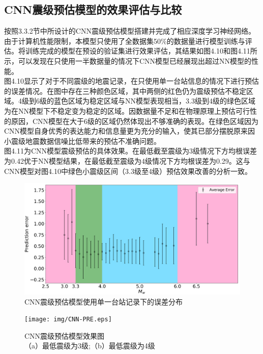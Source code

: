 \subsection{CNN震级预估模型的效果评估与比较}
\indent 按照3.3.2节中所设计的CNN震级预估模型搭建并完成了相应深度学习神经网络。由于计算机性能限制，本模型只使用了全数据集50\%的数据量进行模型训练与评估。将训练完成的模型在预设的验证集进行效果评估，其结果如图4.10和图4.11所示，可以发现在只使用一半数据量的情况下CNN模型已经展现出超过NN模型的性能。\\
\indent 图4.10显示了对于不同震级的地震记录，在只使用单一台站信息的情况下进行预估的误差情况。在图中存在三种颜色区域，其中两侧的红色仍为震级预估不稳定区域。4级到6级的蓝色区域为稳定区域与NN模型表现相当，3.3级到4级的绿色区域为在NN模型下不稳定变为稳定的区域。因数据量不足和在物理原理上预估可行性的原因，CNN模型在大于6级的区域仍然体现出不够准确的表现。在绿色区域因为CNN模型自身优秀的表达能力和信息量更为充分的输入，使其已部分摆脱原来因小震级地震数据信噪比低带来的预估不准确问题。\\
\indent 图4.11为CNN模型震级预估的具体效果。在最低截至震级为3级情况下方均根误差为0.42优于NN模型结果，在最低截至震级为4级情况下方均根误差为0.29。这与CNN模型对图4.10中绿色小震级区间（3.3级至4级）预估效果改善的分析一致。\\
\begin{figure}[!h]%
	\centering  %
	\includegraphics[width=\linewidth]{img/eb1_cnn.jpg}  %
	\caption{CNN震级预估模型使用单一台站记录下的误差分布}  %
	\label{fig:mcmthesis-logo}   %
\end{figure}
\begin{figure}[!h]%
	\centering  %
	\texttt{[image: img/CNN-PRE.eps]}  %
	\caption{CNN震级预估模型效果图\\
（a）最低震级为3级;（b）最低震级为4级}  %
	\label{fig:mcmthesis-logo}   %
\end{figure}

